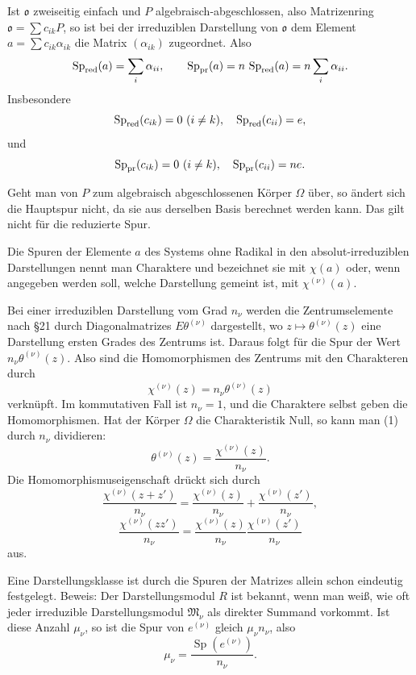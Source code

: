 \documentclass[11pt]{article}
\providecommand{\mM}{\mathfrak{M}}
\providecommand{\mo}{\mathfrak{o}}
\begin{document}
Ist $\mo$ zweiseitig einfach und $P$ algebraisch-abgeschlossen, also Matrizenring $\mo=\sum c_{ik}P$, so ist bei der irreduziblen Darstellung von $\mo$ dem Element $a=\sum c_{ik}\alpha_{ik}$ die Matrix $(\alpha_{ik})$ zugeordnet. Also
\[
        \operatorname{Sp}_{\rm red}(a)=\sum_i\alpha_{ii},
        \qquad
        \operatorname{Sp}_{\rm pr}(a)=n\,\operatorname{Sp}_{\rm red}(a)=n\sum_i\alpha_{ii}.
\]
Insbesondere
\[
        \operatorname{Sp}_{\rm red}(c_{ik})=0\ (i\ne k),\quad
        \operatorname{Sp}_{\rm red}(c_{ii})=e,
\]
und
\[
        \operatorname{Sp}_{\rm pr}(c_{ik})=0\ (i\ne k),\quad
        \operatorname{Sp}_{\rm pr}(c_{ii})=n e.
\]

Geht man von $P$ zum algebraisch abgeschlossenen Körper $\Omega$ über, so ändert sich die Hauptspur nicht, da sie aus derselben Basis berechnet werden kann. Das gilt nicht für die reduzierte Spur.

Die Spuren der Elemente $a$ des Systems ohne Radikal in den absolut-irreduziblen Darstellungen nennt man Charaktere und bezeichnet sie mit $\chi(a)$ oder, wenn angegeben werden soll, welche Darstellung gemeint ist, mit $\chi^{(\nu)}(a)$.

Bei einer irreduziblen Darstellung vom Grad $n_\nu$ werden die Zentrumselemente nach §21 durch Diagonalmatrizes $E\theta^{(\nu)}$ dargestellt, wo $z\mapsto\theta^{(\nu)}(z)$ eine Darstellung ersten Grades des Zentrums ist. Daraus folgt für die Spur der Wert $n_\nu\theta^{(\nu)}(z)$. Also sind die Homomorphismen des Zentrums mit den Charakteren durch
\[
        \chi^{(\nu)}(z)=n_\nu\theta^{(\nu)}(z)                 \tag{1}
\]
verknüpft. Im kommutativen Fall ist $n_\nu=1$, und die Charaktere selbst geben die Homomorphismen. Hat der Körper $\Omega$ die Charakteristik Null, so kann man (1) durch $n_\nu$ dividieren:
\[
        \theta^{(\nu)}(z)=\frac{\chi^{(\nu)}(z)}{n_\nu}.
\]
Die Homomorphismuseigenschaft drückt sich durch
\[
        \frac{\chi^{(\nu)}(z+z')}{n_\nu}
        =\frac{\chi^{(\nu)}(z)}{n_\nu}+\frac{\chi^{(\nu)}(z')}{n_\nu},
\]
\[
        \frac{\chi^{(\nu)}(zz')}{n_\nu}
        =\frac{\chi^{(\nu)}(z)}{n_\nu}\frac{\chi^{(\nu)}(z')}{n_\nu}
\]
aus.

Eine Darstellungsklasse ist durch die Spuren der Matrizes allein schon eindeutig festgelegt. Beweis: Der Darstellungsmodul $R$ ist bekannt, wenn man weiß, wie oft jeder irreduzible Darstellungsmodul $\mM_\nu$ als direkter Summand vorkommt. Ist diese Anzahl $\mu_\nu$, so ist die Spur von $e^{(\nu)}$ gleich $\mu_\nu n_\nu$, also
\[
        \mu_\nu=\frac{\operatorname{Sp}(e^{(\nu)})}{n_\nu}.
\]
\end{document}
